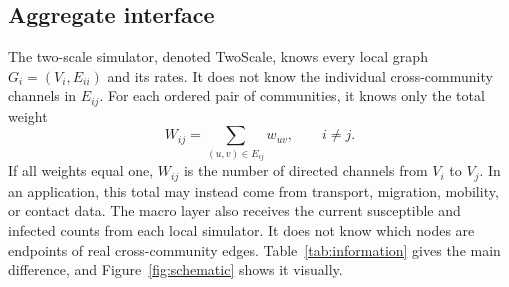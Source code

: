 \documentclass{ieeeaccess}
\newcommand{\TS}{\textup{TwoScale}}
\begin{document}
\subsection{Aggregate interface}
\label{sec:interface}

The two-scale simulator, denoted \TS{}, knows every local graph $G_i=(V_i,E_{ii})$ and its rates. It does not know the individual cross-community channels in $E_{ij}$. For each ordered pair of communities, it knows only the total weight
\begin{equation}
\label{eq:weight}
W_{ij}=\sum_{(u,v)\in E_{ij}}w_{uv},
\qquad i\neq j.
\end{equation}
If all weights equal one, $W_{ij}$ is the number of directed channels from $V_i$ to $V_j$. In an application, this total may instead come from transport, migration, mobility, or contact data. The macro layer also receives the current susceptible and infected counts from each local simulator. It does not know which nodes are endpoints of real cross-community edges. Table~\ref{tab:information} gives the main difference, and Figure~\ref{fig:schematic} shows it visually.
\end{document}
